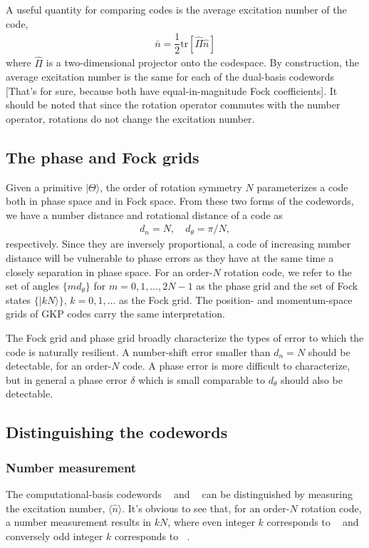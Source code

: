 \documentclass{article}
\DeclareMathOperator{\lgczero}{|\bar{0}\rangle}
\DeclareMathOperator{\lgcone}{|\bar{1}\rangle}
\begin{document}
A useful quantity for comparing codes is the average excitation number of the code,
\begin{align}
    \bar{n} = \dfrac{1}{2}\text{tr}[\hat{\Pi}\hat{n}]
\end{align}
where $\hat{\Pi}$ is a two-dimensional projector onto the codespace. By construction, the average excitation number is the same for each of the dual-basis codewords [That's for sure, because both have equal-in-magnitude Fock coefficients]. It should be noted that since the rotation operator commutes with the number operator, rotations do not change the excitation number. 
\subsection{The phase and Fock grids}
Given a primitive $|\Theta\rangle$, the order of rotation symmetry $N$ parameterizes a code both in phase space and in Fock space. From these two forms of the codewords, we have a number distance and rotational distance of a code as 
\begin{align}
    d_n = N,\quad d_\theta=\pi/N,
\end{align}
respectively. Since they are inversely proportional, a code of increasing number distance will be vulnerable to phase errors as they have at the same time a closely separation in phase space. For an order-$N$ rotation code, we refer to the set of angles $\{md_\theta\}$ for $m=0, 1,\dots, 2N-1$ as the phase grid and the set of Fock states $\{|kN\rangle\}$, $k=0,1,\dots$ as the Fock grid.  The position- and momentum-space grids of GKP codes carry the same interpretation.

The Fock grid and phase grid broadly characterize the types of error to which the code is naturally resilient. A number-shift error smaller than $d_n=N$ should be detectable, for an order-$N$ code. A phase error is more difficult to characterize, but in general a phase error $\delta$ which is small comparable to $d_\theta$ should also be detectable.
\subsection{Distinguishing the codewords}
\subsubsection{Number measurement}
The computational-basis codewords $\lgczero$ and $\lgcone$ can be distinguished by measuring the excitation number, $\langle \hat{n}\rangle$. It's obvious to see that, for an order-$N$ rotation code, a number measurement results in $kN$, where even integer $k$ corresponds to $\lgczero$ and conversely odd integer $k$ corresponds to $\lgcone$.
\end{document}
